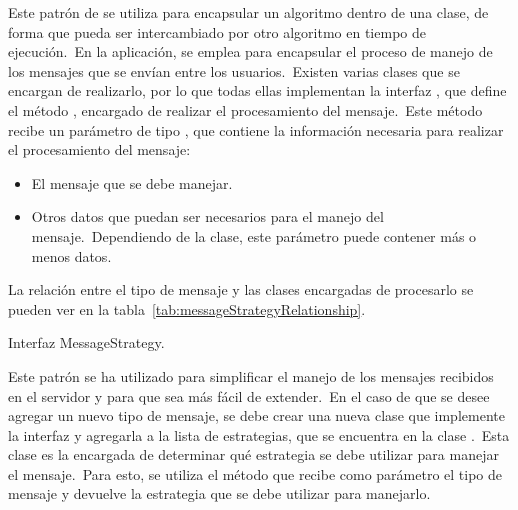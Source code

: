 Este patrón de  se utiliza para encapsular un algoritmo dentro de una clase, de forma que
pueda ser intercambiado por otro algoritmo en tiempo de ejecución.\ En la aplicación, se emplea para encapsular el
proceso de manejo de los mensajes que se envían entre los usuarios.\ Existen varias clases que se encargan de
realizarlo, por lo que todas ellas implementan la interfaz , que define el método
, encargado de realizar el procesamiento del mensaje.\ Este método recibe un
parámetro de tipo , que contiene la información necesaria para realizar el procesamiento
del mensaje:

\begin{itemize}
	\item El mensaje que se debe manejar.
	\item Otros datos que puedan ser necesarios para el manejo del mensaje.\ Dependiendo de la clase, este parámetro
	puede contener más o menos datos.
\end{itemize}
\label{itm:parametershandlestrategy}

La relación entre el tipo de mensaje y las clases encargadas de procesarlo se pueden ver en la
tabla~\ref{tab:messageStrategyRelationship}.

\begin{umlDiagram}
	\centering

	\caption{Interfaz MessageStrategy.}
\end{umlDiagram}

Este patrón se ha utilizado para simplificar el manejo de los mensajes recibidos en el servidor y para que sea más
fácil de extender.\ En el caso de que se desee agregar un nuevo tipo de mensaje, se debe crear una nueva clase que
implemente la interfaz  y agregarla a la lista de estrategias, que se encuentra en la
clase .\ Esta clase es la encargada de determinar qué estrategia se debe utilizar para
manejar el mensaje.\ Para esto, se utiliza el método  que
recibe como parámetro el tipo de mensaje y devuelve la estrategia que se debe utilizar para manejarlo.

